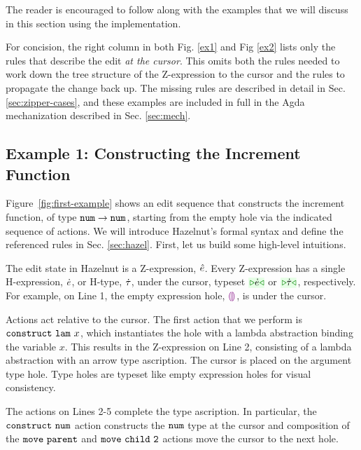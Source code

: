 The reader is encouraged to follow along with the examples that we will
discuss in this section using the implementation.

For concision, the right column in both Fig. \ref{ex1} and Fig \ref{ex2}
lists only the rules that describe the edit \emph{at the cursor}. This
omits both the rules needed to work down the tree structure of the
{Z-expression} to the cursor and the rules to propagate the change back
up. The missing rules are described in detail in
Sec. \ref{sec:zipper-cases}, and these examples are included in full in the
Agda mechanization described in Sec. \ref{sec:mech}.

\subsection{Example 1: Constructing the Increment Function}

Figure~\ref{fig:first-example} shows an edit sequence that constructs the
increment function, of type $\texttt{num} \rightarrow \texttt{num}$, starting from the empty
hole via the indicated sequence of {actions}. We will introduce Hazelnut's
formal syntax and define the referenced rules in
Sec. \ref{sec:hazel}. First, let us build some high-level intuitions.

The edit state in Hazelnut is a {Z-expression}, $\hat{e}$. Every Z-expression
has a single {H-expression}, $\dot{e}$, or {H-type}, $\dot{\tau}$, under the
{cursor}, typeset $\zwsel{\hexp}$ or $\zwsel{\htau}$, respectively. For
example, on Line 1, the empty expression hole, $\textcolor{violet}{\llparenthesis}\textcolor{violet}{\rrparenthesis}$, is under the
cursor.

Actions act relative to the cursor. The first action that we perform is
$\mathtt{construct}~\mathtt{lam}~x$, which instantiates the hole with a lambda
abstraction binding the variable $x$. This results in the Z-expression on
Line 2, consisting of a lambda abstraction with an arrow type
ascription. The cursor is placed on the argument type hole. Type holes are
typeset like empty expression holes for visual consistency.

The actions on Lines 2-5 complete the type ascription. In particular, the
$\mathtt{construct}~\mathtt{num}$ action constructs the $\texttt{num}$ type at the cursor and
composition of the $\mathtt{move}~\mathtt{parent}$ and $\mathtt{move}~\mathtt{child}~\mathtt{{2}}$ actions
move the cursor to the next hole.

